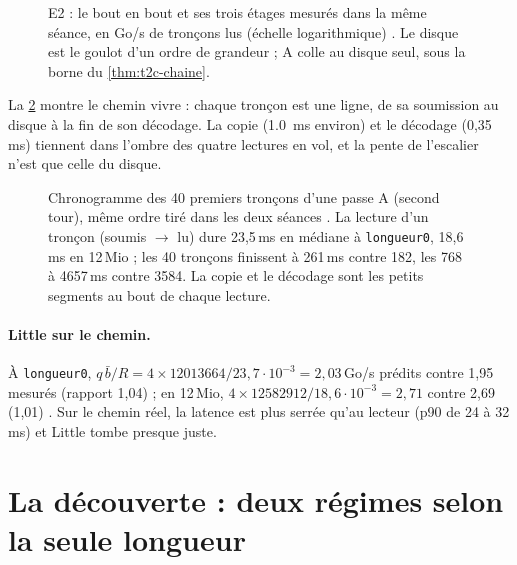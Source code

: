 \begin{figure}[ht]
\centering
\GrapheChmEtages
\caption[E2 : les étages]{E2 : le bout en bout et ses trois étages mesurés dans la même séance, en Go/s de tronçons lus (échelle logarithmique) \mes. Le disque est le goulot d'un ordre de grandeur ; A colle au disque seul, sous la borne du \cref{thm:t2c-chaine}.}
\label{fig:t2c-etages}
\end{figure}

La \cref{fig:t2c-chrono} montre le chemin vivre : chaque tronçon est une ligne, de sa soumission au disque à la fin de son décodage. La copie (\SI{1.0}{\milli\second} environ) et le décodage (0,35\,ms) tiennent dans l'ombre des quatre lectures en vol, et la pente de l'escalier n'est que celle du disque.

\begin{figure}[ht]
\centering
\GrapheChmChrono
\caption[E2 : chronogramme des 40 premiers tronçons]{Chronogramme des 40 premiers tronçons d'une passe A (second tour), même ordre tiré dans les deux séances \mes. La lecture d'un tronçon (soumis $\to$ lu) dure 23,5\,ms en médiane à \texttt{longueur0}, 18,6\,ms en 12\,Mio ; les 40 tronçons finissent à 261\,ms contre 182, les 768 à \num{4657}\,ms contre \num{3584}. La copie et le décodage sont les petits segments au bout de chaque lecture.}
\label{fig:t2c-chrono}
\end{figure}

\paragraph{Little sur le chemin.} À \texttt{longueur0}, $q\,\bar b/R = 4 \times \num{12013664} / 23{,}7\cdot10^{-3} = 2{,}03$\,Go/s prédits contre 1,95 mesurés (rapport 1,04) ; en 12\,Mio, $4 \times \num{12582912} / 18{,}6\cdot10^{-3} = 2{,}71$ contre 2,69 (1,01) \calc. Sur le chemin réel, la latence est plus serrée qu'au lecteur (p90 de 24 à 32\,ms) et Little tombe presque juste.

\section{La découverte : deux régimes selon la seule longueur}\label{sec:t2c-regimes}

